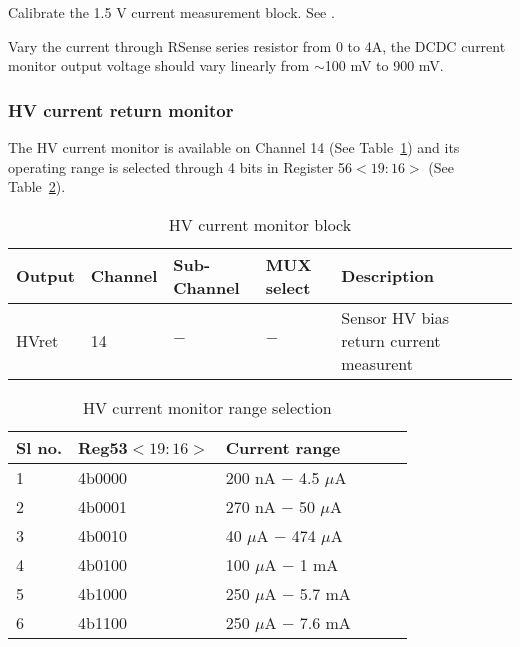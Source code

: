 \documentclass[11pt]{article}   			%
\begin{document}
\begin{compactitem}
    \item{Calibrate the 1.5 V current measurement block. See \cite{AMACv2Calib}.}
    \item{Vary the current through RSense series resistor from 0 to 4A, the DCDC current monitor output voltage should vary linearly from $\sim$100 mV to 900 mV.}
\end{compactitem}

\subsubsection{HV current return monitor}
The HV current monitor is available on Channel 14 (See Table~\ref{tab:hvcm}) and its operating range is selected through 4 bits in Register 56$<19:16>$ (See Table~\ref{tab:hvcmrange}).

\begin{table}[h]
\begin{center}
\begin{tabular}{|l|l|l|l|l|l|}
\hline
{\bf Output} & {\bf Channel} & {\bf Sub-Channel} & {\bf MUX select} & {\bf Description}\\
\hline
HVret & 14 & $-$ & $-$ & Sensor HV bias return current measurent\\
\hline
\end{tabular}
\caption{HV current monitor block}
\label{tab:hvcm}
\end{center}
\end{table}

\begin{table}[h]
\begin{center}
\begin{tabular}{|l|l|l|l|l|l|}
\hline
{\bf Sl no.} & {\bf Reg53$<19:16>$} & {\bf Current range}\\
\hline
1 & 4b0000 & 200 nA $-$ 4.5 $\mu$A\\
\hline
2 & 4b0001 & 270 nA $-$ 50 $\mu$A\\
\hline
3 & 4b0010 & 40 $\mu$A $-$ 474 $\mu$A\\
\hline
4 & 4b0100 & 100 $\mu$A $-$ 1 mA\\
\hline
5 & 4b1000 & 250 $\mu$A $-$ 5.7 mA\\
\hline
6 & 4b1100 & 250 $\mu$A $-$ 7.6 mA\\
\hline
\end{tabular}
\caption{HV current monitor range selection}
\label{tab:hvcmrange}
\end{center}
\end{table}
\end{document}
